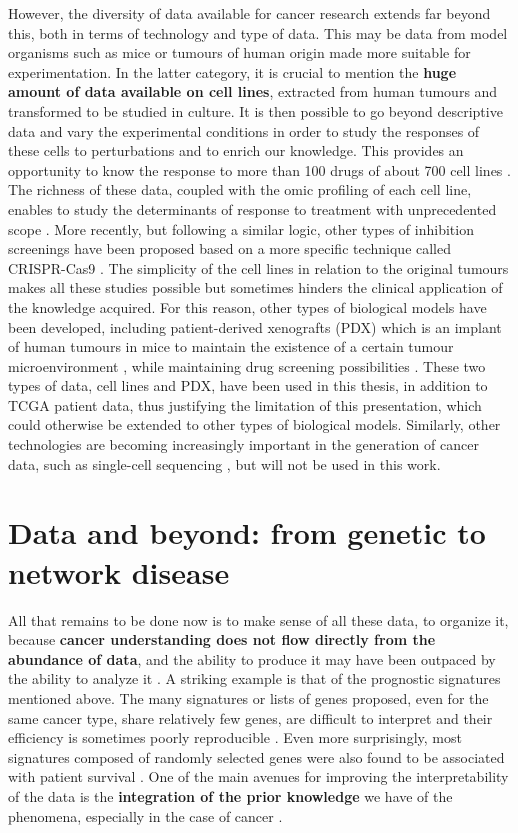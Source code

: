 \documentclass[a4paper,12pt,twoside,onecolumn,openright,final,oldfontcommands]{memoir}
\begin{document}
However, the diversity of data available for cancer research extends far
beyond this, both in terms of technology and type of data. This may be
data from model organisms such as mice or tumours of human origin made
more suitable for experimentation. In the latter category, it is crucial
to mention the \textbf{huge amount of data available on cell lines},
extracted from human tumours and transformed to be studied in culture.
It is then possible to go beyond descriptive data and vary the
experimental conditions in order to study the responses of these cells
to perturbations and to enrich our knowledge. This provides an
opportunity to know the response to more than 100 drugs of about 700
cell lines \citep{yang2012genomics}. The richness of these data, coupled
with the omic profiling of each cell line, enables to study the
determinants of response to treatment with unprecedented scope
\citep{iorio2016landscape}. More recently, but following a similar
logic, other types of inhibition screenings have been proposed based on
a more specific technique called CRISPR-Cas9
\citep{behan2019prioritization}. The simplicity of the cell lines in
relation to the original tumours makes all these studies possible but
sometimes hinders the clinical application of the knowledge acquired.
For this reason, other types of biological models have been developed,
including patient-derived xenografts (PDX) which is an implant of human
tumours in mice to maintain the existence of a certain tumour
microenvironment \citep{hidalgo2014patient}, while maintaining drug
screening possibilities \citep{gao2015high}. These two types of data,
cell lines and PDX, have been used in this thesis, in addition to TCGA
patient data, thus justifying the limitation of this presentation, which
could otherwise be extended to other types of biological models.
Similarly, other technologies are becoming increasingly important in the
generation of cancer data, such as single-cell sequencing
\citep{navin2015first}, but will not be used in this work.

\section{Data and beyond: from genetic to network
disease}\label{data-and-beyond-from-genetic-to-network-disease}

All that remains to be done now is to make sense of all these data, to
organize it, because \textbf{cancer understanding does not flow directly
from the abundance of data}, and the ability to produce it may have been
outpaced by the ability to analyze it \citep{stadler2014cancer}. A
striking example is that of the prognostic signatures mentioned above.
The many signatures or lists of genes proposed, even for the same cancer
type, share relatively few genes, are difficult to interpret and their
efficiency is sometimes poorly reproducible \citep{domany2014using}.
Even more surprisingly, most signatures composed of randomly selected
genes were also found to be associated with patient survival
\citep{venet2011most}. One of the main avenues for improving the
interpretability of the data is the \textbf{integration of the prior
knowledge} we have of the phenomena, especially in the case of cancer
\citep{domany2014using}.
\end{document}
